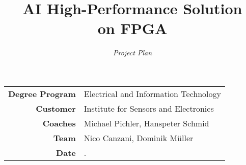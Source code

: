 \documentclass[final]{fhnwreport}
\title{\textbf{{\Huge AI High-Performance Solution \\[2mm] on FPGA}}}
\author{\textit{{\LARGE Project Plan}}}
\date{}
\begin{document}
\maketitle
\vfill
\begin{center}
	\begin{tabular}{>{\bfseries\large}rl}
		Degree Program	& Electrical and Information Technology \\[2mm]
		Customer		& Institute for Sensors and Electronics \\[2mm]
		Coaches			& Michael Pichler, Hanspeter Schmid \\[2mm]
		Team			& Nico Canzani, Dominik M\"uller \\[2mm]
		Date			& \the\day.\MONTH \the\year
	\end{tabular}
\end{center}
\clearpage

\tableofcontents
\clearpage



%





\end{document}
